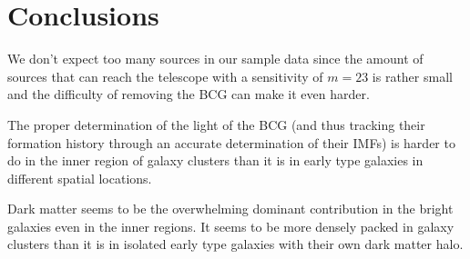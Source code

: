 \chapter{Conclusions}

We don't expect too many sources in our sample data since the amount of sources that can reach the telescope with a sensitivity of $m=23$ is rather small and the difficulty of removing the BCG can make it even harder.

The proper determination of the light of the BCG (and thus tracking their formation history through an accurate determination of their IMFs) is harder to do in the inner region of galaxy clusters than it is in early type galaxies in different spatial locations. 

Dark matter seems to be the overwhelming dominant contribution in the bright galaxies even in the inner regions. It seems to be more densely packed in galaxy clusters than it is in isolated early type galaxies with their own dark matter halo.

